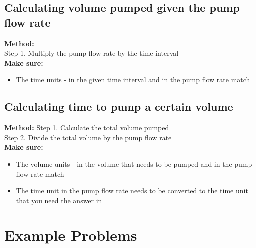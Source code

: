 \subsection{Calculating volume pumped given the pump flow rate}

\textbf{Method:\\}
\hspace{1cm}Step 1. Multiply the pump flow rate by the time interval\\
\textbf{Make sure:}
\begin{itemize}
\item The time units - in the given time interval and in the pump flow rate match
\end{itemize}
\subsection{Calculating time to pump a certain volume}
\textbf{Method:}
\hspace{1cm}Step 1. Calculate the total volume pumped\\
\hspace{1cm}Step 2.	Divide the total volume by the pump flow rate\\
\textbf{Make sure:}
\begin{itemize}
\item The volume units - in the volume that needs to be pumped and in the pump flow rate match
\item The time unit in the pump flow rate needs to be converted to the time unit that you need the answer in
\end{itemize}

\section{Example Problems}

